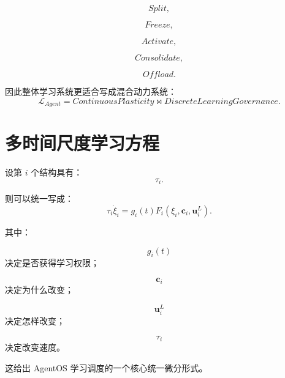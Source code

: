 \begin{equation}
Split,
\end{equation}

\begin{equation}
Freeze,
\end{equation}

\begin{equation}
Activate,
\end{equation}

\begin{equation}
Consolidate,
\end{equation}

\begin{equation}
Offload.
\end{equation}

因此整体学习系统更适合写成混合动力系统：
\begin{equation}
\boxed{
\mathcal{L}_{Agent}
=
ContinuousPlasticity
\bowtie
DiscreteLearningGovernance.
}
\end{equation}


\section{多时间尺度学习方程}

设第 $i$ 个结构具有：
\begin{equation}
\tau_i.
\end{equation}

则可以统一写成：
\begin{equation}
\boxed{
\tau_i
\dot\xi_i
=
g_i(t)
F_i(
\xi_i,
\mathbf{c}_i,
\mathbf{u}_i^L
).
}
\end{equation}

其中：

\begin{equation}
g_i(t)
\end{equation}
决定是否获得学习权限；

\begin{equation}
\mathbf{c}_i
\end{equation}
决定为什么改变；

\begin{equation}
\mathbf{u}_i^L
\end{equation}
决定怎样改变；

\begin{equation}
\tau_i
\end{equation}
决定改变速度。

这给出 AgentOS 学习调度的一个核心统一微分形式。



